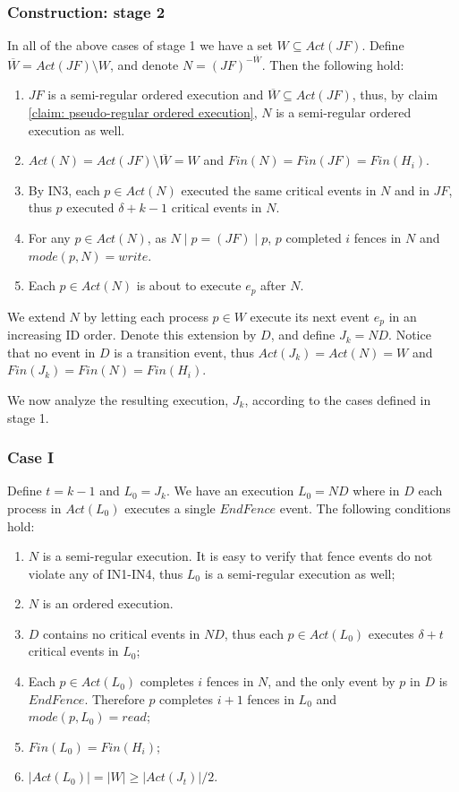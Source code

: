 \subsubsection{Construction: stage 2}
In all of the above cases of stage 1 we have a set $W \subseteq Act(J F)$. Define $\overline{W} = Act(J F) \setminus W$, and denote $N = (J F)^{-\overline{W}}$. Then the following hold:
\begin{enumerate}
	\item $J F$ is a semi-regular ordered execution and $\overline{W} \subseteq Act(J F)$, thus, by claim \ref{claim: pseudo-regular ordered execution}, $N$ is a semi-regular ordered execution as well.
	\item $Act(N) = Act(J F) \setminus \overline{W} = W$ and $Fin(N) = Fin(J F) = Fin(H_i)$.
	\item By IN3, each $p \in Act(N)$ executed the same critical events in $N$ and in $J F$, thus $p$ executed $\delta+k-1$ critical events in $N$.
	\item For any $p\in Act(N)$, as $N \mid p = (J F) \mid p$, $p$ completed $i$ fences in $N$ and $mode(p,N) = write$.
	\item Each $p \in Act(N)$ is about to execute $e_p$ after $N$.
\end{enumerate}

We extend $N$ by letting each process $p \in W$ execute its next event $e_p$ in an increasing ID order. Denote this extension by $D$, and define $J_k = N D$. Notice that no event in $D$ is a transition event, thus $Act(J_k) = Act(N) = W$ and $Fin(J_k) = Fin(N) = Fin(H_i)$.

We now analyze the resulting execution, $J_k$, according to the cases defined in stage 1.
\subsubsection*{\hspace{5mm} Case I}
Define $t = k-1$ and $L_0= J_k$. We have an execution $L_0 = N D$ where in $D$ each process in $Act(L_0)$ executes a single $EndFence$ event. The following conditions hold:
\begin{enumerate}
	\item $N$ is a semi-regular execution. It is easy to verify that fence events do not violate any of IN1-IN4, thus $L_0$ is a semi-regular execution as well;
	\item $N$ is an ordered execution.
	\item $D$ contains no critical events in $N D$, thus each $p \in Act(L_0)$ executes $\delta+t$ critical events in $L_0$;
	\item Each $p \in Act(L_0)$ completes $i$ fences in $N$, and the only event by $p$ in $D$ is $EndFence$. Therefore $p$ completes $i+1$ fences in $L_0$ and $mode(p,L_0) = read$;
	\item $Fin(L_0) = Fin(H_i)$;
	\item $|Act(L_0)| = |W| \geq |Act(J_t)|/2$.
\end{enumerate}

